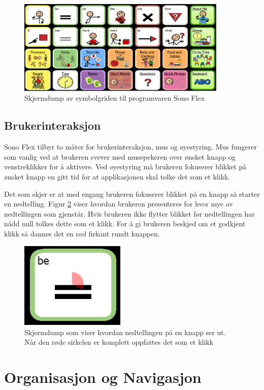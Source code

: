 \documentclass[phd,tocprelim]{cornell}
\begin{document}
\begin{figure}[ht!]
\centering
\includegraphics[width=100mm]{symbolgrid}
\caption{Skjermdump av symbolgriden til programvaren Sono Flex}
\label{fig:symbolgrid}
\end{figure}


\subsection{Brukerinteraksjon}

Sono Flex tilbyr to måter for brukerinteraksjon,  mus og øyestyring. Mus fungerer som vanlig ved at brukeren svever med musepekeren over ønsket knapp og venstreklikker for å aktivere. Ved øyestyring må brukeren fokuserer blikket på ønsket knapp en gitt tid for at applikasjonen skal tolke det som et klikk. 

Det som skjer er at med engang brukeren fokuserer blikket på en knapp så starter en nedtelling. Figur \ref{fig:knapp-interaksjon} viser hvordan brukeren presenteres for hvor mye av nedtellingen som gjenstår.  Hvis brukeren ikke flytter blikket før nedtellingen har nådd null tolkes dette som et klikk.
For å gi brukeren beskjed om et godkjent klikk så dannes det en rød firkant rundt knappen. 

\begin{figure}[ht!]
\centering
\includegraphics[width=50mm]{Knapp-interaksjon}
\caption{Skjermdump som viser hvordan nedtellingen på en knapp ser ut. Når den røde sirkelen er komplett oppfattes det som et klikk}
\label{fig:knapp-interaksjon}
\end{figure}


\section{Organisasjon og Navigasjon}
\end{document}
